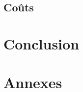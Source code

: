 \documentclass{scrartcl}
\begin{document}
\subsection{Coûts}
\paragraph{}

\newpage


\section{Conclusion}
\paragraph{}

\newpage


\section{Annexes}
\end{document}
